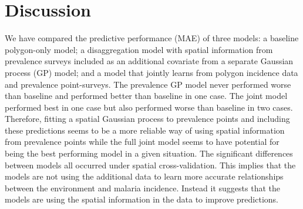 \documentclass{statsoc}
\begin{document}
\begin{table}
\caption{\label{table3}Summary of coverage of 80\% credible intervals. The proportion of held out data points that fall within their 80\% credible intervals. 
Cases where this is below 0.7 are highlighted in bold.}
\centering
{}
\end{table}


\section*{Discussion}



We have compared the predictive performance (MAE) of three models: a baseline polygon-only model; a disaggregation model with spatial information from prevalence surveys included as an additional covariate from a separate Gaussian process (GP) model; and a model that jointly learns from polygon incidence data and prevalence point-surveys.
The prevalence GP model never performed worse than baseline and performed better than baseline in one case.
The joint model performed best in one case but also performed worse than baseline in two cases.
Therefore, fitting a spatial Gaussian process to prevalence points and including these predictions seems to be a more reliable way of using spatial information from prevalence points while the full joint model seems to have potential for being the best performing model in a given situation.
The significant differences between models all occurred under spatial cross-validation.
This implies that the models are not using the additional data to learn more accurate relationships between the environment and malaria incidence. 
Instead it suggests that the models are using the spatial information in the data to improve predictions.
\end{document}
